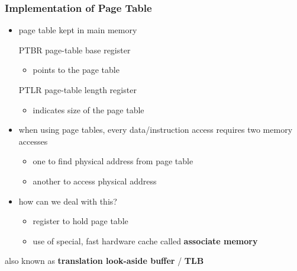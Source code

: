 \documentclass[11pt]{article}
\begin{document}
\subsubsection{Implementation of Page Table}
\label{sec:org41ee103}
\begin{itemize}
\item page table kept in main memory
\item[{PTBR}] page-table base register
\begin{itemize}
\item points to the page table
\end{itemize}
\item[{PTLR}] page-table length register
\begin{itemize}
\item indicates size of the page table
\end{itemize}
\item when using page tables, every data/instruction access requires two memory accesses
\begin{itemize}
\item one to find physical address from page table
\item another to access physical address
\end{itemize}
\item how can we deal with this?
\begin{itemize}
\item register to hold page table
\item use of special, fast hardware cache called \textbf{associate memory}
\end{itemize}
\end{itemize}
also known as \textbf{translation look-aside buffer} / \textbf{TLB}
\end{document}
